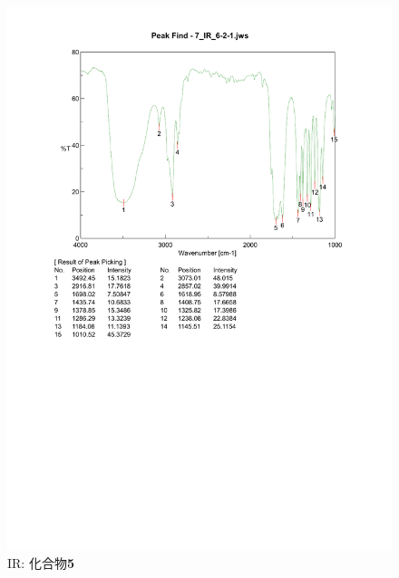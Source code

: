 \documentclass{ltjsarticle}
\theoremstyle{definition}
\numberwithin{equation}{section}
\begin{document}
\begin{figure}[htbp]
\begin{center}
\includegraphics[width = 15 cm]{IR_6-2-1.pdf}
\caption{IR: 化合物\textbf{5}}
\label{IR_6-2-1}
\end{center}
\end{figure}
\end{document}
